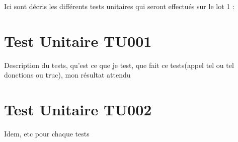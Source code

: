 Ici sont décris les différents tests unitaires qui seront effectués sur le lot 1 :

\section{Test Unitaire TU001}
Description du tests, qu'est ce que je test, que fait ce tests(appel tel ou tel donctions ou truc), mon résultat attendu



\section{Test Unitaire TU002}
Idem, etc pour chaque tests	